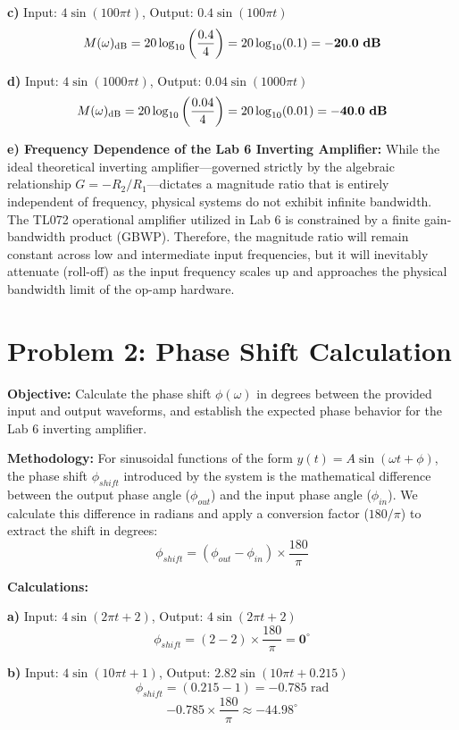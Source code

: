 \documentclass[11pt]{article}
\begin{document}
\textbf{c)} Input: $4\sin(100\pi t)$, Output: $0.4\sin(100\pi t)$
\[ M(\omega)_{\text{dB}} = 20 \log_{10} \left( \frac{0.4}{4} \right) = 20 \log_{10}(0.1) = \mathbf{-20.0} \text{ \textbf{dB}} \]

\textbf{d)} Input: $4\sin(1000\pi t)$, Output: $0.04\sin(1000\pi t)$
\[ M(\omega)_{\text{dB}} = 20 \log_{10} \left( \frac{0.04}{4} \right) = 20 \log_{10}(0.01) = \mathbf{-40.0} \text{ \textbf{dB}} \]

\textbf{e) Frequency Dependence of the Lab 6 Inverting Amplifier:}
While the ideal theoretical inverting amplifier—governed strictly by the algebraic relationship $G = -R_2/R_1$—dictates a magnitude ratio that is entirely independent of frequency, physical systems do not exhibit infinite bandwidth. The TL072 operational amplifier utilized in Lab 6 is constrained by a finite gain-bandwidth product (GBWP). Therefore, the magnitude ratio will remain constant across low and intermediate input frequencies, but it will inevitably attenuate (roll-off) as the input frequency scales up and approaches the physical bandwidth limit of the op-amp hardware.

\section*{Problem 2: Phase Shift Calculation}

\textbf{Objective:} Calculate the phase shift $\phi(\omega)$ in degrees between the provided input and output waveforms, and establish the expected phase behavior for the Lab 6 inverting amplifier.

\textbf{Methodology:}
For sinusoidal functions of the form $y(t) = A \sin(\omega t + \phi)$, the phase shift $\phi_{shift}$ introduced by the system is the mathematical difference between the output phase angle ($\phi_{out}$) and the input phase angle ($\phi_{in}$). We calculate this difference in radians and apply a conversion factor ($180/\pi$) to extract the shift in degrees:
\[ \phi_{shift} = \left( \phi_{out} - \phi_{in} \right) \times \frac{180}{\pi} \]

\textbf{Calculations:}

\textbf{a)} Input: $4\sin(2\pi t + 2)$, Output: $4\sin(2\pi t + 2)$
\[ \phi_{shift} = (2 - 2) \times \frac{180}{\pi} = \mathbf{0^\circ} \]

\textbf{b)} Input: $4\sin(10\pi t + 1)$, Output: $2.82\sin(10\pi t + 0.215)$
\[ \phi_{shift} = (0.215 - 1) = -0.785 \text{ rad} \]
\[ -0.785 \times \frac{180}{\pi} \approx \mathbf{-44.98^\circ} \]
\end{document}
